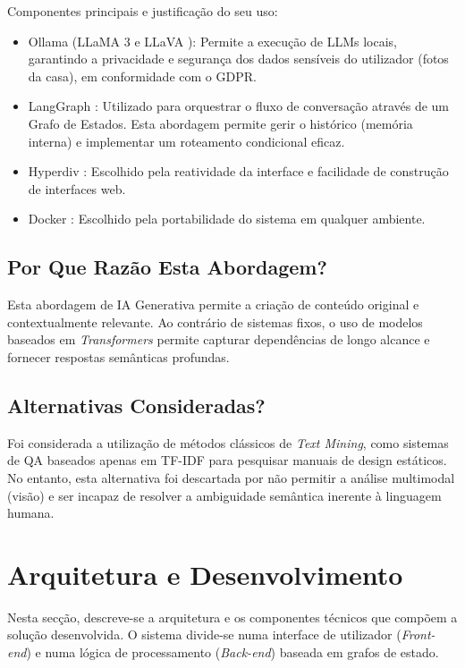 \documentclass[a4paper,12pt]{scrreprt}
\begin{document}
        Componentes principais e justificação do seu uso:
        \begin{itemize}
            \item Ollama \cite{ollama} (LLaMA 3 \cite{llama} e LLaVA \cite{llava}): Permite a execução de LLMs locais, garantindo a privacidade e segurança dos dados sensíveis do utilizador (fotos da casa), em conformidade com o GDPR.
            \item LangGraph \cite{langgraph}: Utilizado para orquestrar o fluxo de conversação através de um Grafo de Estados. Esta abordagem permite gerir o histórico (memória interna) e implementar um roteamento condicional eficaz.
            \item Hyperdiv \cite{hyperdiv}: Escolhido pela reatividade da interface e facilidade de construção de interfaces web.
            \item Docker \cite{docker}: Escolhido pela portabilidade do sistema em qualquer ambiente.
        \end{itemize}

    \subsection{Por Que Razão Esta Abordagem?}
        Esta abordagem de IA Generativa permite a criação de conteúdo original e contextualmente relevante. Ao contrário de sistemas fixos, o uso de modelos baseados em \textit{Transformers} permite capturar dependências de longo alcance e fornecer respostas semânticas profundas.

    \subsection{Alternativas Consideradas?}
        Foi considerada a utilização de métodos clássicos de \textit{Text Mining}, como sistemas de QA baseados apenas em TF-IDF para pesquisar manuais de design estáticos. No entanto, esta alternativa foi descartada por não permitir a análise multimodal (visão) e ser incapaz de resolver a ambiguidade semântica inerente à linguagem humana.

    \section{Arquitetura e Desenvolvimento}
        Nesta secção, descreve-se a arquitetura e os componentes técnicos que compõem a solução desenvolvida. O sistema divide-se numa interface de utilizador (\textit{Front-end}) e numa lógica de processamento (\textit{Back-end}) baseada em grafos de estado.
\end{document}
